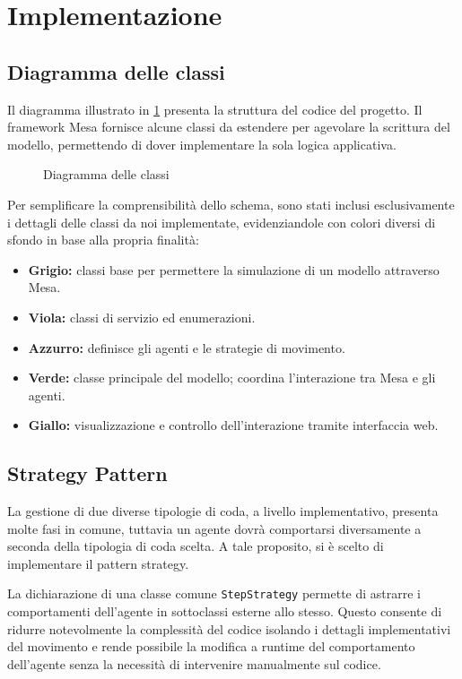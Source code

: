 \section{Implementazione}

\subsection{Diagramma delle classi}
Il diagramma illustrato in \cref{fig:class-diagram} presenta la struttura del codice del progetto. Il framework Mesa fornisce alcune classi da estendere per agevolare la scrittura del modello, permettendo di dover implementare la sola logica applicativa.

\begin{figure}[H]
    \caption{Diagramma delle classi}
    \label{fig:class-diagram}
\end{figure}

\noindent
Per semplificare la comprensibilità dello schema, sono stati inclusi esclusivamente i dettagli delle classi da noi implementate, evidenziandole con colori diversi di sfondo in base alla propria finalità:
\begin{itemize}
    \item \textbf{Grigio:} classi base per permettere la simulazione di un modello attraverso Mesa.
    \item \textbf{Viola:} classi di servizio ed enumerazioni.
    \item \textbf{Azzurro:} definisce gli agenti e le strategie di movimento.
    \item \textbf{Verde:} classe principale del modello; coordina l'interazione tra Mesa e gli agenti.
    \item \textbf{Giallo:} visualizzazione e controllo dell'interazione tramite interfaccia web.
\end{itemize}

\subsection{Strategy Pattern}
La gestione di due diverse tipologie di coda, a livello implementativo, presenta molte fasi in comune, tuttavia un agente dovrà comportarsi diversamente a seconda della tipologia di coda scelta.
A tale proposito, si è scelto di implementare il pattern strategy.

La dichiarazione di una classe comune \lstinline{StepStrategy} permette di astrarre i comportamenti dell'agente in sottoclassi esterne allo stesso.
Questo consente di ridurre notevolmente la complessità del codice isolando i dettagli implementativi del movimento e rende possibile la modifica a runtime del comportamento dell'agente senza la necessità di intervenire manualmente sul codice.

